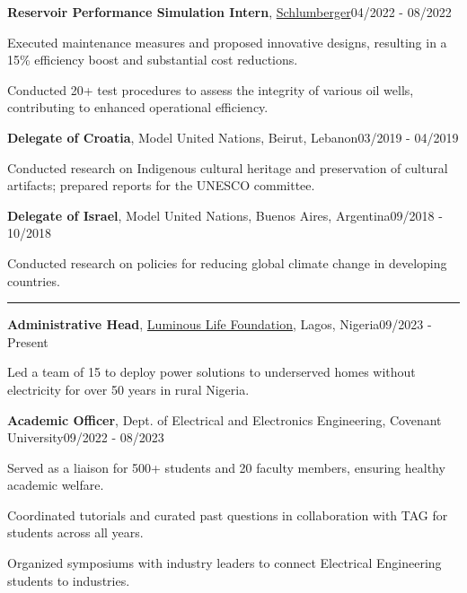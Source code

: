 \documentclass[11pt, a4paper]{article}
\newcommand{\entrytitle}[3]{
    \noindent\textbf{#1}, #2\hfill#3
}
\newcommand{\sectiontitle}[1]{\vspace{1mm}{\color{primaryColor}\noindent\textbf{#1}}\vspace{1.5mm}\hrule\vspace{1mm}}
\begin{document}
\entrytitle{Reservoir Performance Simulation Intern}{\href{https://www.slb.com/}{Schlumberger}}{04/2022 - 08/2022}
\begin{details}
    \item Executed maintenance measures and proposed innovative designs, resulting in a 15\% efficiency boost and substantial cost reductions.
    \item Conducted 20+ test procedures to assess the integrity of various oil wells, contributing to enhanced operational efficiency.
\end{details}

\entrytitle{Delegate of Croatia}{Model United Nations, Beirut, Lebanon}{03/2019 - 04/2019}
\begin{details}
    \item Conducted research on Indigenous cultural heritage and preservation of cultural artifacts; prepared reports for the UNESCO committee.
\end{details}

\entrytitle{Delegate of Israel}{Model United Nations, Buenos Aires, Argentina}{09/2018 - 10/2018}
\begin{details}
    \item Conducted research on policies for reducing global climate change in developing countries.
\end{details}



\sectiontitle{Leadership Experience}

\entrytitle{Administrative Head}{\href{https://luminous-life.org/}{Luminous Life Foundation}, Lagos, Nigeria}{09/2023 - Present}
\begin{details}
    \item Led a team of 15 to deploy power solutions to underserved homes without electricity for over 50 years in rural Nigeria.
\end{details}

\entrytitle{Academic Officer}{Dept. of Electrical and Electronics Engineering, Covenant University}{09/2022 - 08/2023}
\begin{details}
    \item Served as a liaison for 500+ students and 20 faculty members, ensuring healthy academic welfare.
    \item Coordinated tutorials and curated past questions in collaboration with TAG for students across all years.
    \item Organized symposiums with industry leaders to connect Electrical Engineering students to industries.
\end{details}
\end{document}
